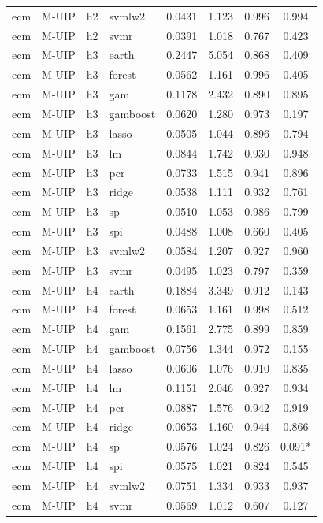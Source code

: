 \begin{ThreePartTable}
\begin{longtable}[t]{llclcccc}
ecm & M-UIP & h2 & svmlw2 & 0.0431 & 1.123 & 0.996 & 0.994\\
ecm & M-UIP & h2 & svmr & 0.0391 & 1.018 & 0.767 & 0.423\\
\addlinespace
ecm & M-UIP & h3 & earth & 0.2447 & 5.054 & 0.868 & 0.409\\
ecm & M-UIP & h3 & forest & 0.0562 & 1.161 & 0.996 & 0.405\\
ecm & M-UIP & h3 & gam & 0.1178 & 2.432 & 0.890 & 0.895\\
ecm & M-UIP & h3 & gamboost & 0.0620 & 1.280 & 0.973 & 0.197\\
ecm & M-UIP & h3 & lasso & 0.0505 & 1.044 & 0.896 & 0.794\\
ecm & M-UIP & h3 & lm & 0.0844 & 1.742 & 0.930 & 0.948\\
ecm & M-UIP & h3 & pcr & 0.0733 & 1.515 & 0.941 & 0.896\\
ecm & M-UIP & h3 & ridge & 0.0538 & 1.111 & 0.932 & 0.761\\
ecm & M-UIP & h3 & sp & 0.0510 & 1.053 & 0.986 & 0.799\\
ecm & M-UIP & h3 & spi & 0.0488 & 1.008 & 0.660 & 0.405\\
ecm & M-UIP & h3 & svmlw2 & 0.0584 & 1.207 & 0.927 & 0.960\\
ecm & M-UIP & h3 & svmr & 0.0495 & 1.023 & 0.797 & 0.359\\
\addlinespace
ecm & M-UIP & h4 & earth & 0.1884 & 3.349 & 0.912 & 0.143\\
ecm & M-UIP & h4 & forest & 0.0653 & 1.161 & 0.998 & 0.512\\
ecm & M-UIP & h4 & gam & 0.1561 & 2.775 & 0.899 & 0.859\\
ecm & M-UIP & h4 & gamboost & 0.0756 & 1.344 & 0.972 & 0.155\\
ecm & M-UIP & h4 & lasso & 0.0606 & 1.076 & 0.910 & 0.835\\
ecm & M-UIP & h4 & lm & 0.1151 & 2.046 & 0.927 & 0.934\\
ecm & M-UIP & h4 & pcr & 0.0887 & 1.576 & 0.942 & 0.919\\
ecm & M-UIP & h4 & ridge & 0.0653 & 1.160 & 0.944 & 0.866\\
ecm & M-UIP & h4 & sp & 0.0576 & 1.024 & 0.826 & 0.091*\\
ecm & M-UIP & h4 & spi & 0.0575 & 1.021 & 0.824 & 0.545\\
ecm & M-UIP & h4 & svmlw2 & 0.0751 & 1.334 & 0.933 & 0.937\\
ecm & M-UIP & h4 & svmr & 0.0569 & 1.012 & 0.607 & 0.127\\

\end{longtable}
\end{ThreePartTable}
